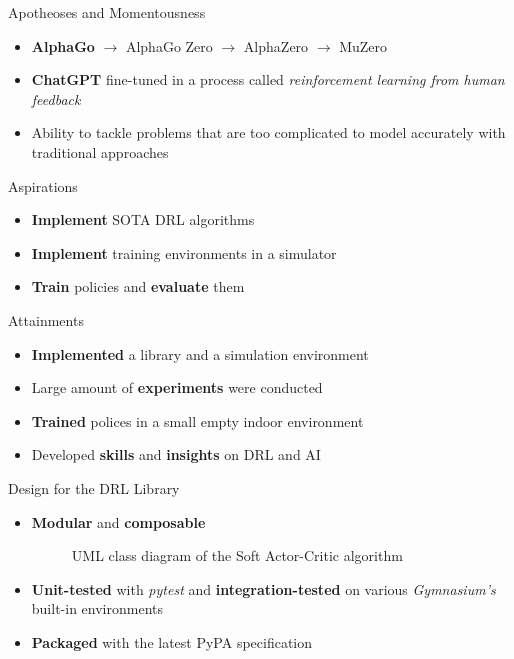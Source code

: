 


\begin{frame}[fragile]\centering

\begin{columns}[T]



\begin{column}{.46\textwidth}

\begin{block}{Apotheoses and Momentousness}
\begin{itemize}
\item \textbf{AlphaGo} $\rightarrow$ AlphaGo Zero $\rightarrow$ AlphaZero $\rightarrow$ MuZero
\item \textbf{ChatGPT} fine-tuned in a process called \emph{reinforcement learning from human feedback}
\item Ability to tackle problems that are too complicated to model accurately with traditional approaches
\end{itemize}
\end{block}

\begin{block}{Aspirations}
\begin{itemize}
\item \textbf{Implement} SOTA DRL algorithms
\item \textbf{Implement} training environments in a simulator
\item \textbf{Train} policies and \textbf{evaluate} them
\end{itemize}
\end{block}

\begin{block}{Attainments}
\begin{itemize}
\item \textbf{Implemented} a library and a simulation environment
\item Large amount of \textbf{experiments} were conducted
\item \textbf{Trained} polices in a small empty indoor environment
\item Developed \textbf{skills} and \textbf{insights} on DRL and AI
\end{itemize}
\end{block}

\begin{block}{Design for the DRL Library}
\begin{itemize}
\item \textbf{Modular} and \textbf{composable}
\begin{figure}[htbp]
\centering

\caption{UML class diagram of the Soft Actor-Critic algorithm}
\end{figure}
\item \textbf{Unit-tested} with \emph{pytest} and \textbf{integration-tested} on various \emph{Gymnasium's} built-in environments
\item \textbf{Packaged} with the latest PyPA specification
\end{itemize}
\end{block}


\end{column}
\end{columns}
\end{frame}
